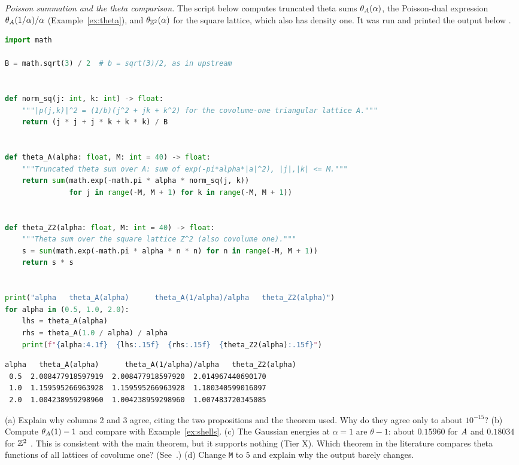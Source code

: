 \begin{exercise}[(M, Python)]\label{ex:py-theta}
\emph{Poisson summation and the theta comparison.} The script below computes truncated theta sums
$\theta_A(\alpha)$, the Poisson-dual expression $\theta_A(1/\alpha)/\alpha$ (Example~\ref{ex:theta}), and
$\theta_{\mathbb{Z}^2}(\alpha)$ for the square lattice, which also has density one. It was run and printed the output below
\tierX{}.
\begin{lstlisting}[language=Python]
import math

B = math.sqrt(3) / 2  # b = sqrt(3)/2, as in upstream


def norm_sq(j: int, k: int) -> float:
    """|p(j,k)|^2 = (1/b)(j^2 + jk + k^2) for the covolume-one triangular lattice A."""
    return (j * j + j * k + k * k) / B


def theta_A(alpha: float, M: int = 40) -> float:
    """Truncated theta sum over A: sum of exp(-pi*alpha*|a|^2), |j|,|k| <= M."""
    return sum(math.exp(-math.pi * alpha * norm_sq(j, k))
               for j in range(-M, M + 1) for k in range(-M, M + 1))


def theta_Z2(alpha: float, M: int = 40) -> float:
    """Theta sum over the square lattice Z^2 (also covolume one)."""
    s = sum(math.exp(-math.pi * alpha * n * n) for n in range(-M, M + 1))
    return s * s


print("alpha   theta_A(alpha)      theta_A(1/alpha)/alpha   theta_Z2(alpha)")
for alpha in (0.5, 1.0, 2.0):
    lhs = theta_A(alpha)
    rhs = theta_A(1.0 / alpha) / alpha
    print(f"{alpha:4.1f}  {lhs:.15f}  {rhs:.15f}  {theta_Z2(alpha):.15f}")
\end{lstlisting}
\begin{lstlisting}
alpha   theta_A(alpha)      theta_A(1/alpha)/alpha   theta_Z2(alpha)
 0.5  2.008477918597919  2.008477918597920  2.014967440690170
 1.0  1.159595266963928  1.159595266963928  1.180340599016097
 2.0  1.004238959298960  1.004238959298960  1.007483720345085
\end{lstlisting}
(a) Explain why columns 2 and 3 agree, citing the two propositions and the theorem used. Why do they agree only to
about $10^{-15}$? (b) Compute $\theta_A(1)-1$ and compare with Example~\ref{ex:shells}. (c) The Gaussian energies at
$\alpha=1$ are $\theta-1$: about $0.15960$ for $A$ and $0.18034$ for $\mathbb{Z}^2$ \tierX{}. This is consistent with the main
theorem, but it supports nothing (Tier X). Which theorem in the literature compares theta functions of all lattices of
covolume one? (See~\cite{montgomery}.) (d) Change \texttt{M} to $5$ and explain why the output barely changes.
\end{exercise}

